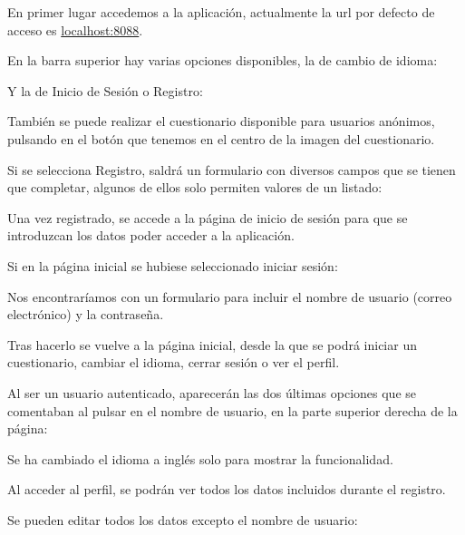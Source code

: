 En primer lugar accedemos a la aplicación, actualmente la url por defecto de acceso es \url{localhost:8088}.


En la barra superior hay varias opciones disponibles, la de cambio de idioma:


Y la de Inicio de Sesión o Registro:


También se puede realizar el cuestionario disponible para usuarios anónimos, pulsando en el botón que tenemos en el centro de la imagen del cuestionario.

Si se selecciona Registro, saldrá un formulario con diversos campos que se tienen que completar, algunos de ellos solo permiten valores de un listado:


Una vez registrado, se accede a la página de inicio de sesión para que se introduzcan los datos poder acceder a la aplicación.

Si en la página inicial se hubiese seleccionado iniciar sesión:


Nos encontraríamos con un formulario para incluir el nombre de usuario (correo electrónico) y la contraseña. 

Tras hacerlo se vuelve a la página inicial, desde la que se podrá iniciar un cuestionario, cambiar el idioma, cerrar sesión o ver el perfil.

Al ser un usuario autenticado, aparecerán las dos últimas opciones que se comentaban al pulsar en el nombre de usuario, en la parte superior derecha de la página:


Se ha cambiado el idioma a inglés solo para mostrar la funcionalidad.

Al acceder al perfil, se podrán ver todos los datos incluidos durante el registro. 

Se pueden editar todos los datos excepto el nombre de usuario:


